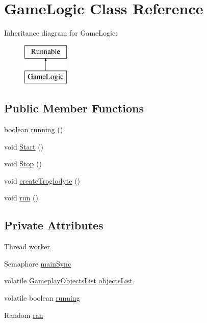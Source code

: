 \hypertarget{classGameLogic}{\section{Game\-Logic Class Reference}
\label{classGameLogic}
}
Inheritance diagram for Game\-Logic\-:\begin{figure}[H]
\begin{center}
\leavevmode
\includegraphics[height=2.000000cm]{dd/d20/classGameLogic}
\end{center}
\end{figure}
\subsection*{Public Member Functions}
\begin{DoxyCompactItemize}
\item 
boolean \hyperlink{classGameLogic_a3c8aac57f25ae1d7d83144a22b6a6569}{running} ()
\item 
void \hyperlink{classGameLogic_a5c8a5055ff4a003a255bcdf52cbd4d2c}{Start} ()
\item 
void \hyperlink{classGameLogic_a53f9f036abbff3736a0d2bed33198b06}{Stop} ()
\item 
void \hyperlink{classGameLogic_a3a00031f831728a8073b58229e3d23c4}{create\-Troglodyte} ()
\item 
void \hyperlink{classGameLogic_a51ad9cef9c4414961b2f025bf659c068}{run} ()
\end{DoxyCompactItemize}
\subsection*{Private Attributes}
\begin{DoxyCompactItemize}
\item 
Thread \hyperlink{classGameLogic_a63998de862313caa158c414ad3a8dad0}{worker}
\item 
Semaphore \hyperlink{classGameLogic_a09c53c7f1a59ad90cd34966360edddcc}{main\-Sync}
\item 
volatile \hyperlink{classGameplayObjectsList}{Gameplay\-Objects\-List} \hyperlink{classGameLogic_a48be08c7f3371c4e6fc68aaf6c839afe}{objects\-List}
\item 
volatile boolean \hyperlink{classGameLogic_af6686d787ae2639adc84f522f332c3ee}{running}
\item 
Random \hyperlink{classGameLogic_a1b940a2b65f42fdee9ee1fb7a910b1d2}{ran}
\end{DoxyCompactItemize}
